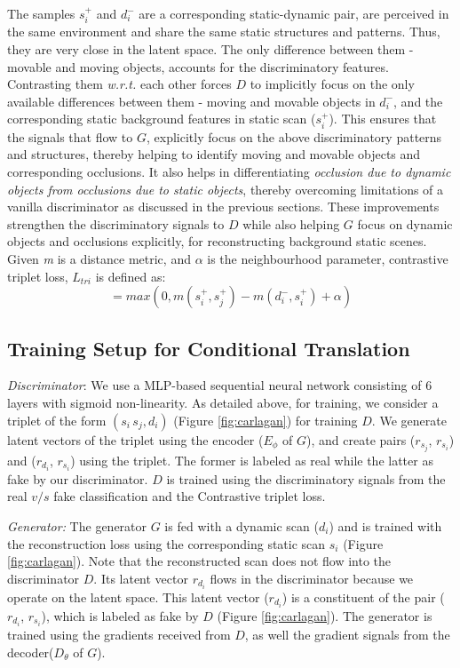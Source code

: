 The samples $s_i^+$ and $d_i^-$ are a corresponding static-dynamic pair, are perceived in the same environment and share the same static structures and patterns. Thus, they are very close in the latent space. The only difference between them - movable and moving objects, accounts for the discriminatory features. Contrasting them \textit{w.r.t.} each other forces $D$ to implicitly focus on the only available differences between them - moving and movable objects in $d_i^-$, and the corresponding static background features in static scan ($s_i^+$). This ensures that the signals that flow to $G$, explicitly focus on the above discriminatory patterns and structures, thereby helping to identify moving and movable objects and corresponding occlusions.
It also helps in differentiating \textit{occlusion due to dynamic objects from occlusions due to static objects}, thereby overcoming limitations of a vanilla discriminator as discussed in the previous sections. These improvements strengthen the discriminatory signals to $D$ while also helping $G$ focus on dynamic objects and occlusions explicitly, for reconstructing background static scenes. Given \textit{m} is a distance metric, and $\alpha$ is the neighbourhood parameter, contrastive triplet loss, $L_{tri}$ is defined as:
\begin{equation}
        =max(0, m( s_i^+, s_j^+)  - m(d_i^-, s_i^+) + \alpha)
\end{equation}


\subsection{Training Setup for Conditional Translation}
\label{setup-carla}


 \textit{Discriminator}: We use a MLP-based sequential neural network consisting of 6 layers with sigmoid non-linearity. As detailed above, for training, we consider a triplet of the form $(s_i\, s_j, d_i)$ (Figure \ref{fig:carlagan}) for training $D$. We generate latent vectors of the triplet using the encoder ($E_{\phi}$ of $G$), and create pairs ($r_{s_j}$, $r_{s_i}$) and ($r_{d_i}$, $r_{s_i}$) using the triplet. The former is labeled as real while the latter as fake by our discriminator. $D$ is trained using the discriminatory signals from the real $v/s$ fake classification and  the Contrastive triplet loss.

\textit{Generator:} The generator $G$ is fed with a dynamic scan ($d_i$) and is trained with the reconstruction loss using the corresponding static scan $s_i$ (Figure \ref{fig:carlagan}). Note that the reconstructed scan does not flow into the discriminator $D$. Its latent vector $r_{d_i}$ flows in the discriminator because we operate on the latent space. This latent vector ($r_{d_i}$) is a constituent of the pair ($r_{d_i}$, $r_{s_i}$), which is labeled as fake by $D$ (Figure \ref{fig:carlagan}).
The generator is trained using the gradients received from $D$, as well the gradient signals from the decoder($D_{\theta}$ of $G$).


